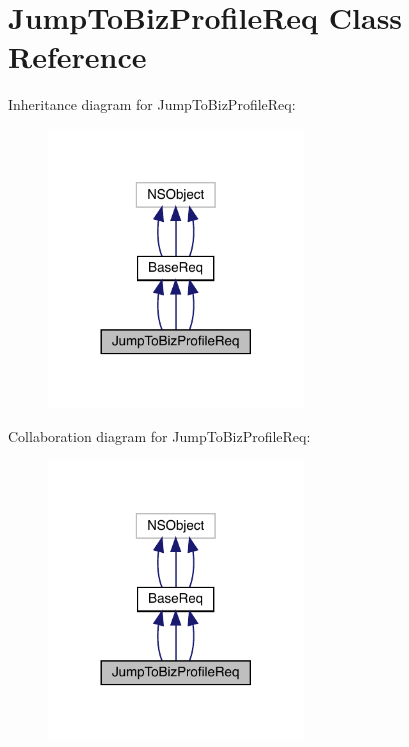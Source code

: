 \hypertarget{interface_jump_to_biz_profile_req}{}\section{Jump\+To\+Biz\+Profile\+Req Class Reference}
\label{interface_jump_to_biz_profile_req}


Inheritance diagram for Jump\+To\+Biz\+Profile\+Req\+:\nopagebreak
\begin{figure}[H]
\begin{center}
\leavevmode
\includegraphics[width=192pt]{interface_jump_to_biz_profile_req__inherit__graph}
\end{center}
\end{figure}


Collaboration diagram for Jump\+To\+Biz\+Profile\+Req\+:\nopagebreak
\begin{figure}[H]
\begin{center}
\leavevmode
\includegraphics[width=192pt]{interface_jump_to_biz_profile_req__coll__graph}
\end{center}
\end{figure}
